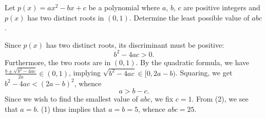 \begin{question}[25]\label{Q::2021-O-1-20}
    Let $p(x) = ax^2 - bx + c$ be a polynomial where $a$, $b$, $c$ are positive integers and $p(x)$ has two distinct roots in $(0, 1)$. Determine the least possible value of $abc$.
\end{question}
\begin{solution*}
    Since $p(x)$ has two distinct roots, its discriminant must be positive: \[b^2 - 4ac > 0. \tag{1}\] Furthermore, the two roots are in $(0, 1)$. By the quadratic formula, we have $\frac{b \pm \sqrt{b^2 - 4ac}}{2a} \in (0, 1)$, implying $\sqrt{b^2 - 4ac} \in [0, 2a-b)$. Squaring, we get $b^2 - 4ac < (2a-b)^2$, whence \[a > b - c.\tag{2}\] Since we wish to find the smallest value of $abc$, we fix $c = 1$. From (2), we see that $a = b$. (1) thus implies that $a = b = 5$, whence $abc = 25$.
\end{solution*}

